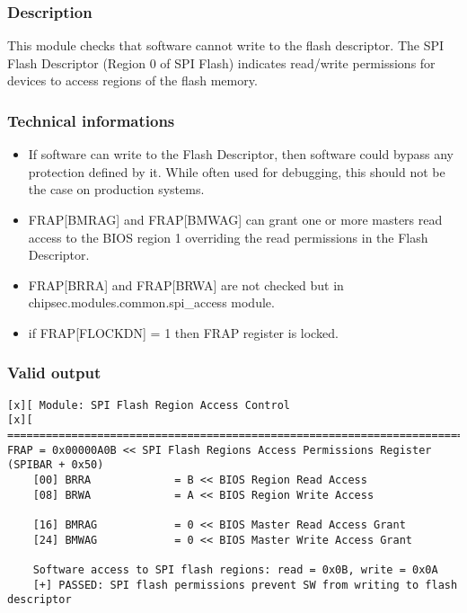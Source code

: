 \hypertarget{description-1}{%
\subsubsection{Description}\label{description-1}}

This module checks that software cannot write to the flash descriptor.
The SPI Flash Descriptor (Region 0 of SPI Flash) indicates read/write
permissions for devices to access regions of the flash memory.

\hypertarget{technical-informations-1}{%
\subsubsection{Technical informations}\label{technical-informations-1}}

\begin{itemize}
\tightlist
\item
  If software can write to the Flash Descriptor, then software could
  bypass any protection defined by it. While often used for debugging,
  this should not be the case on production systems.
\item
  FRAP{[}BMRAG{]} and FRAP{[}BMWAG{]} can grant one or more masters read
  access to the BIOS region 1 overriding the read permissions in the
  Flash Descriptor.
\item
  FRAP{[}BRRA{]} and FRAP{[}BRWA{]} are not checked but in
  chipsec.modules.common.spi\_access module.
\item
  if FRAP{[}FLOCKDN{]} = 1 then FRAP register is locked.
\end{itemize}

\hypertarget{valid-output-1}{%
\subsubsection{Valid output}\label{valid-output-1}}

\begin{verbatim}
[x][ Module: SPI Flash Region Access Control
[x][ =======================================================================
FRAP = 0x00000A0B << SPI Flash Regions Access Permissions Register (SPIBAR + 0x50)
    [00] BRRA             = B << BIOS Region Read Access 
    [08] BRWA             = A << BIOS Region Write Access 

    [16] BMRAG            = 0 << BIOS Master Read Access Grant 
    [24] BMWAG            = 0 << BIOS Master Write Access Grant
    
    Software access to SPI flash regions: read = 0x0B, write = 0x0A
    [+] PASSED: SPI flash permissions prevent SW from writing to flash descriptor
\end{verbatim}

